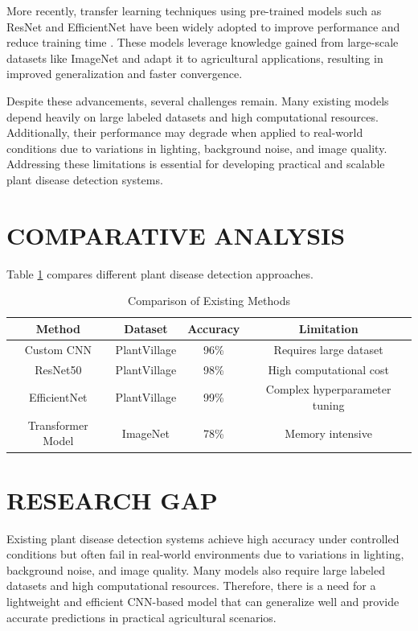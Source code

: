\documentclass[12pt]{report}
\begin{document}
More recently, transfer learning techniques using pre-trained models such as ResNet and EfficientNet have been widely adopted to improve performance and reduce training time \parencite{resnet}. These models leverage knowledge gained from large-scale datasets like ImageNet and adapt it to agricultural applications, resulting in improved generalization and faster convergence.

Despite these advancements, several challenges remain. Many existing models depend heavily on large labeled datasets and high computational resources. Additionally, their performance may degrade when applied to real-world conditions due to variations in lighting, background noise, and image quality. Addressing these limitations is essential for developing practical and scalable plant disease detection systems.

\section{COMPARATIVE ANALYSIS}

Table \ref{tab:comparison-existing-methods} compares different plant disease detection approaches.

\begin{table}[h]
\centering
\caption{Comparison of Existing Methods}
\label{tab:comparison-existing-methods}

\begin{tabular}{|c|c|c|c|}
\hline
\textbf{Method} & \textbf{Dataset} & \textbf{Accuracy} & \textbf{Limitation} \\
\hline
Custom CNN & PlantVillage & 96\% & Requires large dataset \\
ResNet50 & PlantVillage & 98\% & High computational cost \\
EfficientNet & PlantVillage & 99\% & Complex hyperparameter tuning \\
Transformer Model & ImageNet & 78\% & Memory intensive \\
\hline
\end{tabular}
\end{table}

\section{RESEARCH GAP}
Existing plant disease detection systems achieve high accuracy under controlled conditions but often fail in real-world environments due to variations in lighting, background noise, and image quality. Many models also require large labeled datasets and high computational resources. Therefore, there is a need for a lightweight and efficient CNN-based model that can generalize well and provide accurate predictions in practical agricultural scenarios.
\end{document}
